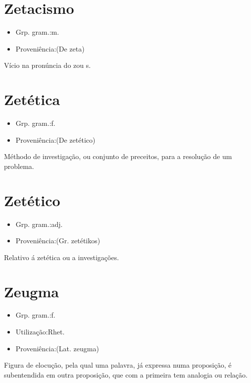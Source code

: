 \section{Zetacismo}
\begin{itemize}
\item {Grp. gram.:m.}
\end{itemize}
\begin{itemize}
\item {Proveniência:(De \textunderscore zeta\textunderscore )}
\end{itemize}
Vício na pronúncia do \textunderscore z\textunderscore  ou \textunderscore s.\textunderscore 
\section{Zetética}
\begin{itemize}
\item {Grp. gram.:f.}
\end{itemize}
\begin{itemize}
\item {Proveniência:(De \textunderscore zetético\textunderscore )}
\end{itemize}
Méthodo de investigação, ou conjunto de preceitos, para a resolução de um problema.
\section{Zetético}
\begin{itemize}
\item {Grp. gram.:adj.}
\end{itemize}
\begin{itemize}
\item {Proveniência:(Gr. \textunderscore zetétikos\textunderscore )}
\end{itemize}
Relativo á zetética ou a investigações.
\section{Zeugma}
\begin{itemize}
\item {Grp. gram.:f.}
\end{itemize}
\begin{itemize}
\item {Utilização:Rhet.}
\end{itemize}
\begin{itemize}
\item {Proveniência:(Lat. \textunderscore zeugma\textunderscore )}
\end{itemize}
Figura de elocução, pela qual uma palavra, já expressa numa proposição, é subentendida em outra proposição, que com a primeira tem analogia ou relação.
